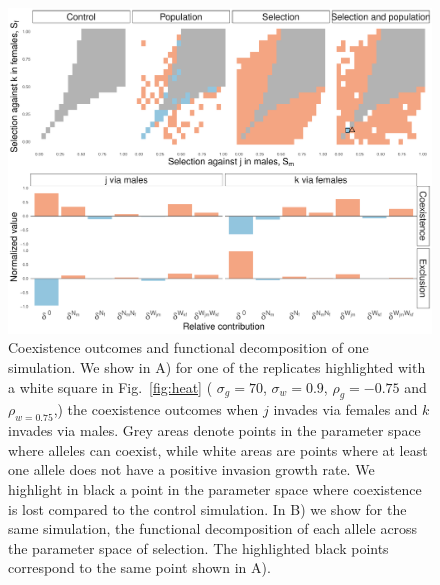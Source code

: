 \documentclass[12pt]{article}
\begin{document}
\begin{figure}[H]
  \centerline{\includegraphics[width=1\textwidth]{outcomes.pdf}}
  \caption{Coexistence outcomes and functional decomposition of one simulation. We show in A) for one of the replicates highlighted with a white square in Fig.~\ref{fig:heat} ( $\sigma_{g} = 70$, $\sigma_{w}= 0.9$, $\rho_{g}=-0.75$ and $\rho_{w= 0.75}$,) the coexistence outcomes when $j$ invades via females and $k$ invades via males. Grey areas denote points in the parameter space where alleles can coexist, while white areas are points where at least one allele does not have a positive invasion growth rate. We highlight in black a point in the parameter space where coexistence is lost compared to the control simulation. In B) we show for the same simulation, the functional decomposition of each allele across the parameter space of selection. The highlighted black points correspond to the same point shown in A).    }
    \label{fig:outcomes}
\end{figure}
\end{document}
